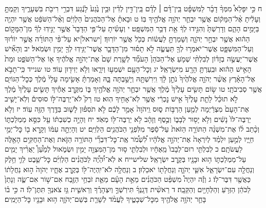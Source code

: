 \documentclass[twoside, openany, parskip=half, 11pt]{book}
\begin{document}
ח כִּ֣י יִפָּלֵא֩ מִמְּךָ֨ דָבָ֜ר לַמִּשְׁפָּ֗ט בֵּֽין־דָּ֨ם ׀ לְדָ֜ם בֵּֽין־דִּ֣ין לְדִ֗ין וּבֵ֥ין נֶ֙גַע֙ לָנֶ֔גַע דִּבְרֵ֥י רִיבֹ֖ת בִּשְׁעָרֶ֑יךָ וְקַמְתָּ֣ וְעָלִ֔יתָ אֶ֨ל־הַמָּק֔וֹם אֲשֶׁ֥ר יִבְחַ֛ר יְהֹוָ֥ה אֱלֹהֶ֖יךָ בּֽוֹ׃ ט וּבָאתָ֗ אֶל־הַכֹּהֲנִים֙ הַלְוִיִּ֔ם וְאֶ֨ל־הַשֹּׁפֵ֔ט אֲשֶׁ֥ר יִהְיֶ֖ה בַּיָּמִ֣ים הָהֵ֑ם וְדָרַשְׁתָּ֙ וְהִגִּ֣ידוּ לְךָ֔ אֵ֖ת דְּבַ֥ר הַמִּשְׁפָּֽט׃ י וְעָשִׂ֗יתָ עַל־פִּ֤י הַדָּבָר֙ אֲשֶׁ֣ר יַגִּ֣ידֽוּ לְךָ֔ מִן־הַמָּק֣וֹם הַה֔וּא אֲשֶׁ֖ר יִבְחַ֣ר יְהֹוָ֑ה וְשָׁמַרְתָּ֣ לַעֲשׂ֔וֹת כְּכֹ֖ל אֲשֶׁ֥ר יוֹרֽוּךָ׃ [ישראל]יא עַל־פִּ֨י הַתּוֹרָ֜ה אֲשֶׁ֣ר יוֹר֗וּךָ וְעַל־הַמִּשְׁפָּ֛ט אֲשֶׁר־יֹאמְר֥וּ לְךָ֖ תַּעֲשֶׂ֑ה לֹ֣א תָס֗וּר מִן־הַדָּבָ֛ר אֲשֶׁר־יַגִּ֥ידֽוּ לְךָ֖ יָמִ֥ין וּשְׂמֹֽאל׃ יב וְהָאִ֞ישׁ אֲשֶׁר־יַעֲשֶׂ֣ה בְזָד֗וֹן לְבִלְתִּ֨י שְׁמֹ֤עַ אֶל־הַכֹּהֵן֙ הָעֹמֵ֞ד לְשָׁ֤רֶת שָׁם֙ אֶת־יְהֹוָ֣ה אֱלֹהֶ֔יךָ א֖וֹ אֶל־הַשֹּׁפֵ֑ט וּמֵת֙ הָאִ֣ישׁ הַה֔וּא וּבִֽעַרְתָּ֥ הָרָ֖ע מִיִּשְׂרָאֵֽל׃ יג וְכׇל־הָעָ֖ם יִשְׁמְע֣וּ וְיִרָ֑אוּ וְלֹ֥א יְזִיד֖וּן עֽוֹד׃
טו שנייד כִּֽי־תָבֹ֣א אֶל־הָאָ֗רֶץ אֲשֶׁ֨ר יְהֹוָ֤ה אֱלֹהֶ֙יךָ֙ נֹתֵ֣ן לָ֔ךְ וִֽירִשְׁתָּ֖הּ וְיָשַׁ֣בְתָּה בָּ֑הּ וְאָמַרְתָּ֗ אָשִׂ֤ימָה עָלַי֙ מֶ֔לֶךְ כְּכׇל־הַגּוֹיִ֖ם אֲשֶׁ֥ר סְבִיבֹתָֽי׃ טו שׂ֣וֹם תָּשִׂ֤ים עָלֶ֙יךָ֙ מֶ֔לֶךְ אֲשֶׁ֥ר יִבְחַ֛ר יְהֹוָ֥ה אֱלֹהֶ֖יךָ בּ֑וֹ מִקֶּ֣רֶב אַחֶ֗יךָ תָּשִׂ֤ים עָלֶ֙יךָ֙ מֶ֔לֶךְ לֹ֣א תוּכַ֗ל לָתֵ֤ת עָלֶ֙יךָ֙ אִ֣ישׁ נׇכְרִ֔י אֲשֶׁ֥ר לֹֽא־אָחִ֖יךָ הֽוּא׃ טז רַק֮ לֹא־יַרְבֶּה־לּ֣וֹ סוּסִים֒ וְלֹֽא־יָשִׁ֤יב אֶת־הָעָם֙ מִצְרַ֔יְמָה לְמַ֖עַן הַרְבּ֣וֹת ס֑וּס וַֽיהֹוָה֙ אָמַ֣ר לָכֶ֔ם לֹ֣א תֹסִפ֗וּן לָשׁ֛וּב בַּדֶּ֥רֶךְ הַזֶּ֖ה עֽוֹד׃ יז וְלֹ֤א יַרְבֶּה־לּוֹ֙ נָשִׁ֔ים וְלֹ֥א יָס֖וּר לְבָב֑וֹ וְכֶ֣סֶף וְזָהָ֔ב לֹ֥א יַרְבֶּה־לּ֖וֹ מְאֹֽד׃ יח וְהָיָ֣ה כְשִׁבְתּ֔וֹ עַ֖ל כִּסֵּ֣א מַמְלַכְתּ֑וֹ וְכָ֨תַב ל֜וֹ אֶת־מִשְׁנֵ֨ה הַתּוֹרָ֤ה הַזֹּאת֙ עַל־סֵ֔פֶר מִלִּפְנֵ֖י הַכֹּהֲנִ֥ים הַלְוִיִּֽם׃ יט וְהָיְתָ֣ה עִמּ֔וֹ וְקָ֥רָא ב֖וֹ כׇּל־יְמֵ֣י חַיָּ֑יו לְמַ֣עַן יִלְמַ֗ד לְיִרְאָה֙ אֶת־יְהֹוָ֣ה אֱלֹהָ֔יו לִ֠שְׁמֹ֠ר אֶֽת־כׇּל־דִּבְרֵ֞י הַתּוֹרָ֥ה הַזֹּ֛את וְאֶת־הַחֻקִּ֥ים הָאֵ֖לֶּה לַעֲשֹׂתָֽם׃ כ לְבִלְתִּ֤י רוּם־לְבָבוֹ֙ מֵֽאֶחָ֔יו וּלְבִלְתִּ֛י ס֥וּר מִן־הַמִּצְוָ֖ה יָמִ֣ין וּשְׂמֹ֑אול לְמַ֩עַן֩ יַאֲרִ֨יךְ יָמִ֧ים עַל־מַמְלַכְתּ֛וֹ ה֥וּא וּבָנָ֖יו בְּקֶ֥רֶב יִשְׂרָאֵֽל׃
שלישייח א לֹֽא־יִ֠הְיֶ֠ה לַכֹּהֲנִ֨ים הַלְוִיִּ֜ם כׇּל־שֵׁ֧בֶט לֵוִ֛י חֵ֥לֶק וְנַחֲלָ֖ה עִם־יִשְׂרָאֵ֑ל אִשֵּׁ֧י יְהֹוָ֛ה וְנַחֲלָת֖וֹ יֹאכֵלֽוּן׃ ב וְנַחֲלָ֥ה לֹא־יִֽהְיֶה־לּ֖וֹ בְּקֶ֣רֶב אֶחָ֑יו יְהֹוָה֙ ה֣וּא נַחֲלָת֔וֹ כַּאֲשֶׁ֖ר דִּבֶּר־לֽוֹ׃
ג וְזֶ֡ה יִהְיֶה֩ מִשְׁפַּ֨ט הַכֹּהֲנִ֜ים מֵאֵ֣ת הָעָ֗ם מֵאֵ֛ת זֹבְחֵ֥י הַזֶּ֖בַח אִם־שׁ֣וֹר אִם־שֶׂ֑ה וְנָתַן֙ לַכֹּהֵ֔ן הַזְּרֹ֥עַ וְהַלְּחָיַ֖יִם וְהַקֵּבָֽה׃ ד רֵאשִׁ֨ית דְּגָֽנְךָ֜ תִּירֹֽשְׁךָ֣ וְיִצְהָרֶ֗ךָ וְרֵאשִׁ֛ית גֵּ֥ז צֹאנְךָ֖ תִּתֶּן־לֽוֹ׃ ה כִּ֣י ב֗וֹ בָּחַ֛ר יְהֹוָ֥ה אֱלֹהֶ֖יךָ מִכׇּל־שְׁבָטֶ֑יךָ לַעֲמֹ֨ד לְשָׁרֵ֧ת בְּשֵׁם־יְהֹוָ֛ה ה֥וּא וּבָנָ֖יו כׇּל־הַיָּמִֽים׃
\end{document}
